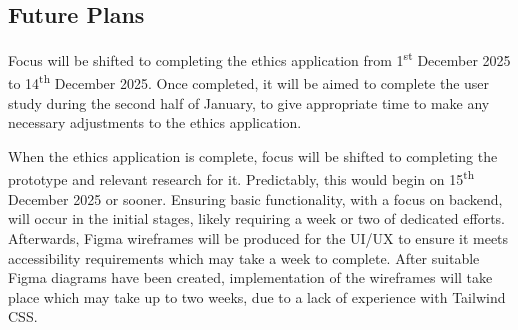 \documentclass[11pt,titlepage,dvipsnames,table,xcdraw]{article}
\begin{document}
\subsection{Future Plans}
Focus will be shifted to completing the ethics application from 1\textsuperscript{st} December 2025 to 14\textsuperscript{th} December 2025. Once completed, it will be aimed to complete the user study during the second half of January, to give appropriate time to make any necessary adjustments to the ethics application.

When the ethics application is complete, focus will be shifted to completing the prototype and relevant research for it. Predictably, this would begin on 15\textsuperscript{th} December 2025 or sooner. Ensuring basic functionality, with a focus on backend, will occur in the initial stages, likely requiring a week or two of dedicated efforts. Afterwards, Figma wireframes will be produced for the UI/UX to ensure it meets accessibility requirements which may take a week to complete. After suitable Figma diagrams have been created, implementation of the wireframes will take place which may take up to two weeks, due to a lack of experience with Tailwind CSS.
\end{document}
